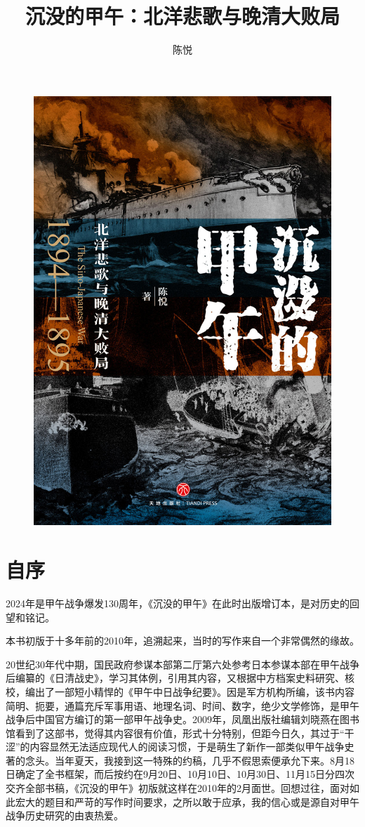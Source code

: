 \documentclass[12pt,UTF8]{ctexbook}
\title{\heiti\zihao{0} 沉没的甲午：北洋悲歌与晚清大败局}
\author{陈悦}
\date{}
\begin{document}
\maketitle
\tableofcontents

\frontmatter

\begin{figure}[htbp]
	\centering
	\includegraphics[width=0.7\linewidth]{cover}
	\caption{}
	\label{fig:1}
\end{figure}

\chapter{自序}

2024年是甲午战争爆发130周年，《沉没的甲午》在此时出版增订本，是对历史的回望和铭记。

本书初版于十多年前的2010年，追溯起来，当时的写作来自一个非常偶然的缘故。

20世纪30年代中期，国民政府参谋本部第二厅第六处参考日本参谋本部在甲午战争后编纂的《日清战史》，学习其体例，引用其内容，又根据中方档案史料研究、核校，编出了一部短小精悍的《甲午中日战争纪要》。因是军方机构所编，该书内容简明、扼要，通篇充斥军事用语、地理名词、时间、数字，绝少文学修饰，是甲午战争后中国官方编订的第一部甲午战争史。2009年，凤凰出版社编辑刘晓燕在图书馆看到了这部书，觉得其内容很有价值，形式十分特别，但距今日久，其过于“干涩”的内容显然无法适应现代人的阅读习惯，于是萌生了新作一部类似甲午战争史著的念头。当年夏天，我接到这一特殊的约稿，几乎不假思索便承允下来。8月18日确定了全书框架，而后按约在9月20日、10月10日、10月30日、11月15日分四次交齐全部书稿，《沉没的甲午》初版就这样在2010年的2月面世。回想过往，面对如此宏大的题目和严苛的写作时间要求，之所以敢于应承，我的信心或是源自对甲午战争历史研究的由衷热爱。
\end{document}
